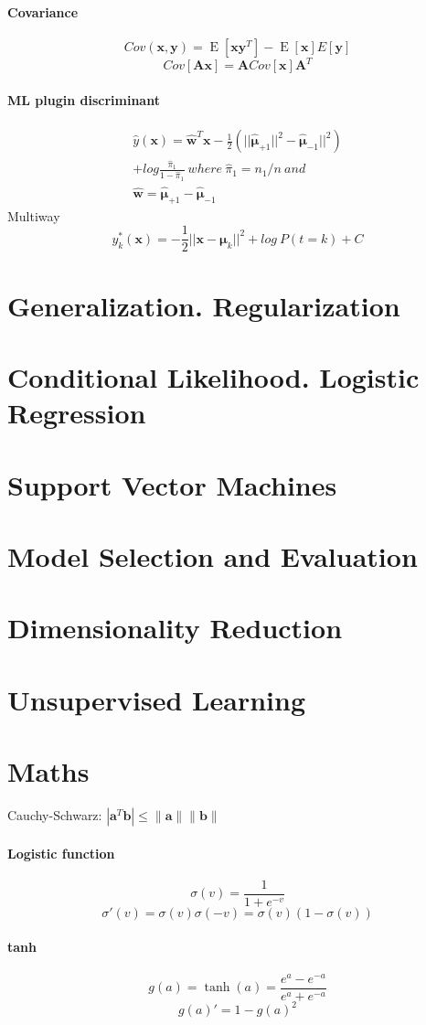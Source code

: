 \documentclass[7pt]{scrartcl}
\DeclareMathOperator{\E}{E}
\begin{document}
\begin{multicols}{4}
\paragraph{Covariance}
$$Cov(\mathbf x, \mathbf y) = \E[\mathbf x \mathbf y ^ T] - \E[\mathbf x]E[\mathbf y]$$
$$Cov[\mathbf A \mathbf x] = \mathbf A Cov[\mathbf x] \mathbf A^T$$

\paragraph{ML plugin discriminant}
\begin{equation*}
\begin{split}
\hat{y}(\mathbf{x}) = \hat{\mathbf{w}}^T \mathbf{x} - \frac{1}{2}(||\hat{\mathbf{\mu}}_{+1} ||^2 - \hat{\mathbf{\mu}}_{-1} ||^2) \\ + log\frac{\hat{\pi}_1}{1-\hat{\pi}_1} ~ where~ \hat{\pi}_1 = n_1 / n ~ and~  \\ \hat{\mathbf{w}}=\hat{\mathbf{\mu}}_{+1} - \hat{\mathbf{\mu}}_{-1}
\end{split}
\end{equation*}
Multiway \[y_k^*(\mathbf{x}) = -\frac{1}{2}||\mathbf{x}-\mathbf{\mu}_k||^2 + log~P(t=k) + C\]


\section{Generalization. Regularization}
\section{Conditional Likelihood. Logistic Regression}
\section{Support Vector Machines}
\section{Model Selection and Evaluation}
\section{Dimensionality Reduction}
\section{Unsupervised Learning}
\section{Maths}
Cauchy-Schwarz: $|\mathbf a ^T \mathbf b|\leq \| \mathbf a \| \| \mathbf b \|$
\paragraph{Logistic function}
$$\sigma(v) = \frac{1}{1+e^{-v}}$$
$$\sigma'(v) = \sigma(v)\sigma(-v) = \sigma(v)(1-\sigma(v))$$
\paragraph{tanh}
$$g(a)=\tanh(a)=\frac{e^a-e^{-a}}{e^a + e^{-a}}$$
$$g(a)'=1 - g(a)^2$$
\end{multicols}
\end{document}
